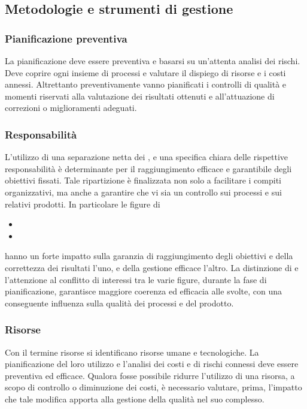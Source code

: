 \documentclass[12pt,a4paper]{article}
\begin{document}
\subsection{Metodologie e strumenti di gestione}

\subsubsection{Pianificazione preventiva}
La pianificazione deve essere preventiva e basarsi su un'attenta analisi dei rischi. Deve coprire ogni insieme di processi e valutare il dispiego di risorse e i costi annessi. Altrettanto preventivamente vanno pianificati i controlli di qualità e momenti riservati alla valutazione dei risultati ottenuti e all'attuazione di correzioni o miglioramenti adeguati.

\subsubsection{Responsabilità}
L'utilizzo di una separazione netta dei , e una specifica chiara delle rispettive responsabilità è determinante per il raggiungimento efficace e garantibile degli obiettivi fissati. Tale ripartizione è finalizzata non solo a facilitare i compiti organizzativi, ma anche a garantire che vi sia un controllo sui processi e sui relativi prodotti. In particolare le figure di
\begin{itemize}
	\item {} 
	\item \RE
\end{itemize}
hanno un forte impatto sulla garanzia di raggiungimento degli obiettivi e della correttezza dei risultati l'uno, e della gestione efficace l'altro. La distinzione di  e l'attenzione al conflitto di interessi tra le varie figure, durante la fase di pianificazione, garantisce maggiore coerenza ed efficacia alle   svolte, con una conseguente influenza sulla qualità dei  processi e del prodotto.

\subsubsection{Risorse}\label{risorse}
Con il termine risorse si identificano risorse umane e tecnologiche. La pianificazione del loro utilizzo e l'analisi dei costi e di rischi connessi deve essere preventiva ed efficace. Qualora fosse possibile ridurre l'utilizzo di una risorsa, a scopo di controllo o diminuzione dei costi, è necessario valutare, prima, l'impatto che tale modifica apporta alla gestione della qualità nel suo complesso.
\end{document}
